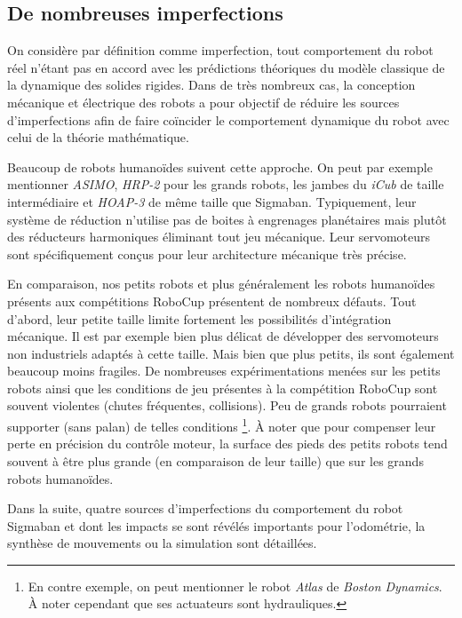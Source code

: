 \subsection{De nombreuses imperfections\label{sec:robot_flaws}}

On considère par définition comme imperfection,
tout comportement du robot réel n'étant pas en accord
avec les prédictions théoriques du modèle classique
de la dynamique des solides rigides.
Dans de très nombreux cas, la conception mécanique et électrique des 
robots a pour objectif de réduire les sources d'imperfections 
afin de faire coïncider le comportement dynamique du robot avec celui 
de la théorie mathématique.

Beaucoup de robots humanoïdes suivent cette approche.
On peut par exemple mentionner \textit{ASIMO}, \textit{HRP-2} pour les grands
robots, les jambes du \textit{iCub} de taille intermédiaire 
et \textit{HOAP-3} de même taille que Sigmaban.
Typiquement, leur système de réduction n'utilise pas de boites à engrenages
planétaires mais plutôt des réducteurs harmoniques éliminant tout jeu mécanique.
Leur servomoteurs sont spécifiquement conçus pour leur architecture mécanique très précise.

En comparaison, nos petits robots et plus généralement les robots humanoïdes présents
aux compétitions RoboCup présentent de nombreux défauts.
Tout d'abord, leur petite taille limite fortement les possibilités 
d'intégration mécanique.
Il est par exemple bien plus délicat de développer 
des servomoteurs non industriels adaptés à cette taille.
Mais bien que plus petits, ils sont également beaucoup moins fragiles.
De nombreuses expérimentations menées sur les petits robots 
ainsi que les conditions de jeu présentes à la compétition
RoboCup sont souvent violentes (chutes fréquentes, collisions). 
Peu de grands robots pourraient supporter (sans palan) de telles 
conditions \footnote{En contre exemple, on peut mentionner le robot \textit{Atlas} 
de \textit{Boston Dynamics}. À noter cependant que ses actuateurs sont hydrauliques.}.
À noter que pour compenser leur perte en précision du contrôle moteur, 
la surface des pieds des petits robots tend souvent à
être plus grande (en comparaison de leur taille) que sur 
les grands robots humanoïdes.

Dans la suite, quatre sources d'imperfections du comportement du robot Sigmaban 
et dont les impacts se sont révélés importants pour l'odométrie, la synthèse de
mouvements ou la simulation sont détaillées.

